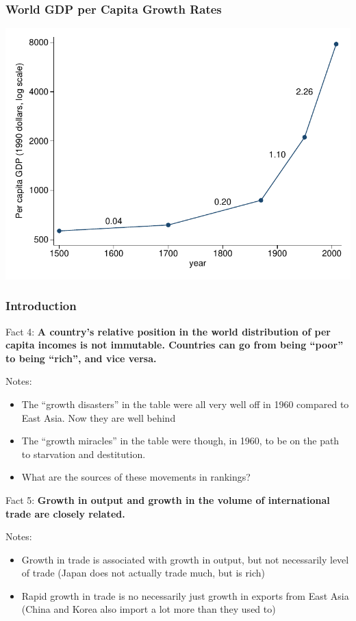 \documentclass[shownotes,11pt, aspectratio=169]{beamer}
\begin{document}
\begin{frame}
\frametitle{World GDP per Capita Growth Rates}
\begin{center}
\includegraphics[scale=0.8]{graphs/figure_1_3.pdf}
\end{center}
\end{frame}


\begin{frame}
\frametitle{Introduction}
Fact 4: \textbf{A country's relative position in the world distribution of per capita incomes is not immutable. Countries can go from being ``poor'' to being ``rich'', and vice versa.}

\vspace{.25in}\noindent Notes:
\begin{itemize}
	\item The ``growth disasters'' in the table were all very well off in 1960 compared to East Asia. Now they are well behind
	\item The ``growth miracles'' in the table were though, in 1960, to be on the path to starvation and destitution. 
	\item What are the sources of these movements in rankings?
\end{itemize}
\end{frame}

\begin{frame}
Fact 5: \textbf{Growth in output and growth in the volume of international trade are closely related.}

\vspace{.25in}\noindent Notes:
\begin{itemize}
	\item Growth in trade is associated with growth in output, but not necessarily level of trade (Japan does not actually trade much, but is rich)
	\item Rapid growth in trade is no necessarily just growth in exports from East Asia (China and Korea also import a lot more than they used to)
\end{itemize}
\end{frame}
\end{document}
